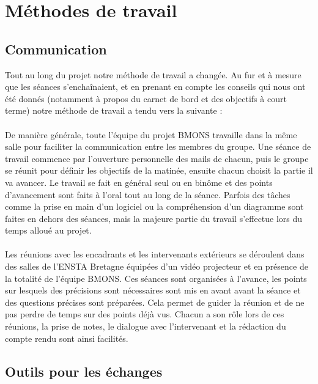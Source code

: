 \chapter{Méthodes de travail}


\section{Communication}

Tout au long du projet notre méthode de travail a changée. Au fur et à mesure que les séances s’enchaînaient, et en prenant en compte les conseils qui nous ont été donnés (notamment à propos du carnet de bord et des objectifs à court terme) notre méthode de travail a tendu vers la suivante : \\ \\
De manière générale, toute l'équipe du projet BMONS travaille dans la même salle pour faciliter la communication entre les membres du groupe. Une séance de travail commence par l'ouverture personnelle des mails de chacun, puis le groupe se réunit pour définir les objectifs de la matinée, ensuite chacun choisit la partie il va avancer. Le travail se fait en général seul ou en binôme et des points d'avancement sont faits à l'oral tout au long de la séance. Parfois des tâches comme la prise en main d'un logiciel ou la compréhension d'un diagramme sont faites en dehors des séances, mais la majeure partie du travail s'effectue lors du temps alloué au projet. \\ \\
Les réunions avec les encadrants et les intervenants extérieurs se déroulent dans des salles de l'ENSTA Bretagne équipées d'un vidéo projecteur et en présence de la totalité de l'équipe BMONS. Ces séances sont organisées à l'avance, les points sur lesquels des précisions sont nécessaires sont mis en avant avant la séance et des questions précises sont préparées. Cela permet de guider la réunion et de ne pas perdre de temps sur des points déjà vus. Chacun a son rôle lors de ces réunions, la prise de notes, le dialogue avec l'intervenant et la rédaction du compte rendu sont ainsi facilités.

\section{Outils pour les échanges}

